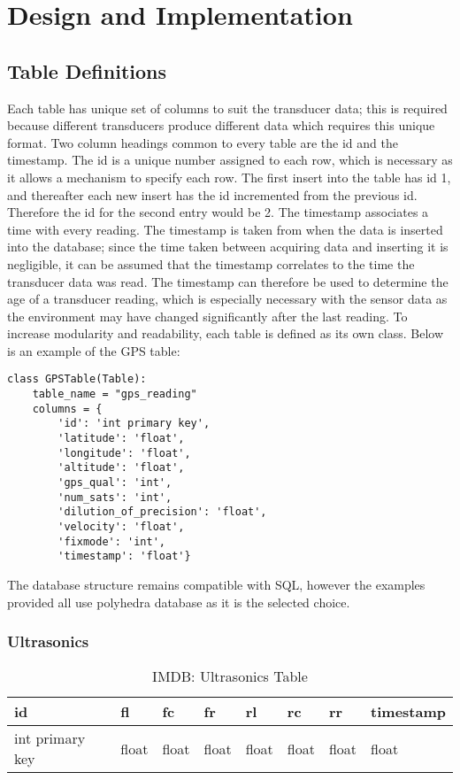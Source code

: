 \section{Design and Implementation}

\subsection{Table Definitions}
Each table has unique set of columns to suit the transducer data; this is required because different transducers produce different data which requires this unique format. Two column headings common to every table are the id and the timestamp. 
\newline
The id is a unique number assigned to each row, which is necessary as it allows a mechanism to specify each row. The first insert into the table has id 1, and thereafter each new insert has the id incremented from the previous id. Therefore the id for the second entry would be 2.
\newline
The timestamp associates a time with every reading. The timestamp is taken from when the data is inserted into the database; since the time taken between acquiring data and inserting it is negligible, it can be assumed that the timestamp correlates to the time the transducer data was read. The timestamp can therefore be used to determine the age of a transducer reading, which is especially necessary with the sensor data as the environment may have changed significantly after the last reading.
\newline
To increase modularity and readability, each table is defined as its own class. Below is an example of the GPS table:
\newline
\begin{lstlisting}[style=custompython]
class GPSTable(Table):
    table_name = "gps_reading"
    columns = {
        'id': 'int primary key',
        'latitude': 'float',
        'longitude': 'float',
        'altitude': 'float',
        'gps_qual': 'int',
        'num_sats': 'int',
        'dilution_of_precision': 'float',
        'velocity': 'float',
        'fixmode': 'int',
        'timestamp': 'float'}
\end{lstlisting}
\noindent
The database structure remains compatible with SQL, however the examples provided all use polyhedra database as it is the selected choice.

\subsubsection{Ultrasonics}
\begin{table}[!htb]
\centering
\begin{tabular}{|l|l|l|l|l|l|l|l|}
\hline
id              & fl    & fc    & fr    & rl    & rc    & rr    & timestamp \\ \hline
int primary key & float & float & float & float & float & float & float \\ \hline
\end{tabular}
\caption{IMDB: Ultrasonics Table}
\label{tab:db-ultrasonics}
\end{table}


